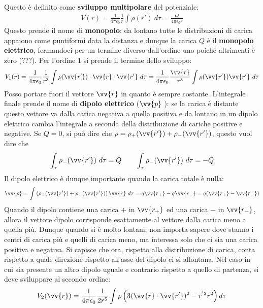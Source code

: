 \documentclass[a4paper, oneside]{article}
\begin{document}
Questo è definito come \textbf{sviluppo multipolare} del potenziale:
\begin{gather*}
    V(r) = \frac{1}{4\pi\epsilon_0} \frac{1}{r}\int \rho(r') \ d\tau = \frac{Q}{4\pi\epsilon_0 r} 
\end{gather*}
Questo prende il nome di \textbf{monopolo}: da lontano tutte le distribuzioni di carica
appaiono come puntiformi data la distanza e dunque la carica $Q$ è il \textbf{monopolo elettrico}, 
fermandoci per un termine diverso dall'ordine uno poiché altrimenti è zero (???). Per l'ordine 
1 si prende il termine dello sviluppo:
\begin{gather*}
    V_1(r) = \frac{1}{4\pi\epsilon_0} \frac{1}{r^{3}} \int \rho(\vv{r'} ) \cdot \vv{r} \cdot \vv{r'} \ d\tau   = \frac{1}{4\pi\epsilon_0} \frac{\vv{r} }{r^{3}} \int \rho(\vv{r'} ) \vv{r'} \ d\tau  
\end{gather*}
Posso portare fuori il vettore $\vv{r}$ in quanto è sempre costante. L'integrale finale prende il nome di 
\textbf{dipolo elettrico} ($\vv{p}$ ): se la carica è distante questo vettore va dalla carica negativa a quella positiva 
e da lontano in un dipolo elettrico cambia l'integrale a seconda della distribuzione di cariche positive e negative. Se $Q = 0 $, 
si può dire che $\rho = \rho_+(\vv{r'} ) + \rho_- (\vv{r'} )$, questo vuol dire che
\begin{gather*}
    \int_{\tau} \rho_-(\vv{r'} ) \ d\tau = Q \qquad \int_{\tau} \rho_-(\vv{r'} ) \ d\tau = -Q  
\end{gather*}
Il dipolo elettrico è dunque importante quando la carica totale è nulla:
\begin{gather*}
    \vv{p} = \int \left(\rho_+(\vv{r'} ) + \rho_-(\vv{r'} )\right) \vv{r} \ d\tau   = q\vv{r_+} - q\vv{r_-} = q(\vv{r_+} - \vv{r_-}  )  
\end{gather*}
Quando il dipolo contiene una carica $+$ in $\vv{r_+}$ ed una carica $-$ in $\vv{r_-}$, 
allora il vettore dipolo corrisponde esattamente al vettore dalla carica meno a quella più. Dunque 
quando si è molto lontani, non importa sapere dove stanno i centri di carica più e quelli di carica meno,
ma interessa solo che ci sia una carica positiva e negativa. Si capisce che ora, rispetto alla distribuzione 
di carica, conta rispetto a quale direzione rispetto all'asse del dipolo ci si allontana.
Nel caso in cui sia presente un altro dipolo uguale e contrario rispetto a quello di partenza,
si deve sviluppare al secondo ordine:
\begin{gather*}
    V_2(\vv{r} ) = \frac{1}{4\pi\epsilon_0} \frac{1}{2r^{5}}\int\rho\left(3(\vv{r} \cdot \vv{r'}  )^{2} - r^{'2} r^{2}\right) d\tau
\end{gather*}
\end{document}
